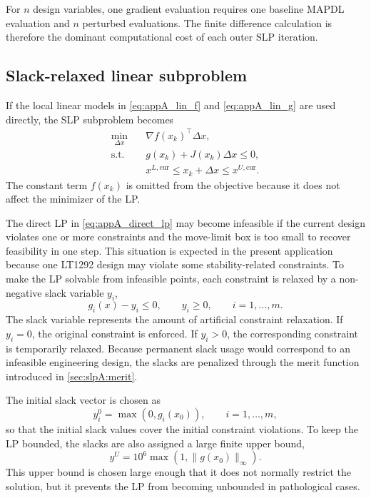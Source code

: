 \documentclass[11pt,a4paper]{article}
\begin{document}
For $n$ design variables, one gradient evaluation requires one
baseline MAPDL evaluation and $n$ perturbed evaluations. The finite
difference calculation is therefore the dominant computational cost
of each outer SLP iteration.

\subsection{Slack-relaxed linear subproblem}
\label{sec:slpA:lp}

If the local linear models in \autoref{eq:appA_lin_f} and
\autoref{eq:appA_lin_g} are used directly, the SLP subproblem becomes
\begin{equation}
\label{eq:appA_direct_lp}
\begin{aligned}
    \min_{\Delta x}\quad
        & \nabla f(x_k)^{\!\top}\Delta x ,
    \\
    \text{s.t.}\quad
        & g(x_k) + J(x_k)\Delta x \leq 0 ,
    \\
        & x^{L,\mathrm{cur}}
          \leq
          x_k + \Delta x
          \leq
          x^{U,\mathrm{cur}} .
\end{aligned}
\end{equation}
The constant term $f(x_k)$ is omitted from the objective because it
does not affect the minimizer of the LP.

The direct LP in \autoref{eq:appA_direct_lp} may become infeasible if
the current design violates one or more constraints and the
move-limit box is too small to recover feasibility in one step. This
situation is expected in the present application because one
LT1292 design may violate some stability-related constraints. To make
the LP solvable from infeasible points, each constraint is
relaxed by a non-negative slack variable $y_i$,
\begin{equation}
\label{eq:appA_slack}
    g_i(x) - y_i \leq 0,
    \qquad
    y_i \geq 0,
    \qquad
    i = 1,\dots,m .
\end{equation}
The slack variable represents the amount of artificial constraint
relaxation. If $y_i = 0$, the original constraint is enforced. If
$y_i > 0$, the corresponding constraint is temporarily relaxed.
Because permanent slack usage would correspond to an infeasible
engineering design, the slacks are penalized through the merit
function introduced in \autoref{sec:slpA:merit}.

The initial slack vector is chosen as
\begin{equation}
\label{eq:appA_slack_init}
    y_i^0 = \max\left(0, g_i(x_0)\right),
    \qquad i = 1,\dots,m ,
\end{equation}
so that the initial slack values cover the initial constraint
violations. To keep the LP bounded, the slacks are also assigned a
large finite upper bound,
\begin{equation}
\label{eq:appA_slack_upper}
    y^U =
    10^6 \max\left(1,\|g(x_0)\|_\infty\right).
\end{equation}
This upper bound is chosen large enough that it does not normally
restrict the solution, but it prevents the LP from becoming
unbounded in pathological cases.
\end{document}
